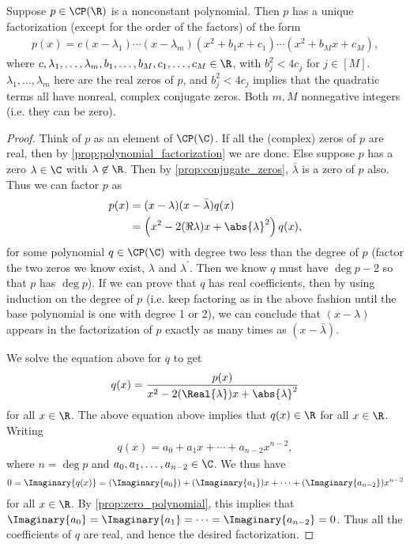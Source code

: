 \documentclass{article}
\begin{document}
\begin{prop}
  Suppose $p \in \CP(\R)$ is a nonconstant polynomial. Then $p$ has a unique factorization (except for the order of the factors) of the form
  \begin{align*}
    p(x) = c(x - \lambda_1)\cdots(x - \lambda_m)(x^2 + b_1x + c_1)\cdots(x^2 + b_Mx + c_M),
  \end{align*}
  where $c, \lambda_1, \dots, \lambda_m, b_1, \dots, b_M, c_1, \dots, c_M \in \R$, with $b_j^2 < 4c_j$ for $j \in [M]$. $\lambda_1, \dots, \lambda_m$ here are the real zeros of $p$, and
  $b_j^2 < 4c_j$ implies that the quadratic terms all have nonreal, complex conjugate zeros. Both $m, M$ nonnegative integers (i.e. they can be zero).
\end{prop}
\begin{proof}
  Think of $p$ as an element of $\CP(\C)$. If all the (complex) zeros of $p$ are real, then by \eqref{prop:polynomial_factorization} we are done. Else suppose $p$ has a zero $\lambda \in \C$
  with $\lambda \not\in \R$. Then by \eqref{prop:conjugate_zeros}, $\bar{\lambda}$ is a zero of $p$ also. Thus we can factor $p$ as
  \begin{align*}
    p(x) & = (x - \lambda)(x - \bar{\lambda})q(x) \\
    & = \left(x^2 - 2(\Re{\lambda})x + \abs{\lambda}^2\right)q(x),
  \end{align*}
  for some polynomial $q \in \CP(\C)$ with degree two less than the degree of $p$ (factor the two zeros we know exist, $\lambda$ and $\lambda^{\prime}$. Then we know $q$ must have $\deg{p} -
  2$ so that $p$ has $\deg{p}$). If we can prove that $q$ has real coefficients, then by using induction on the degree of $p$ (i.e. keep factoring as in the above fashion until the base
  polynomial is one with degree 1 or 2), we can conclude that $(x - \lambda)$ appears in the factorization of $p$ exactly as many times as $(x - \bar{\lambda})$. 

  We solve the equation above for $q$ to get 
  \begin{align*}
    q(x) = \frac{p(x)}{x^2 - 2(\Real{\lambda})x + \abs{\lambda}^2}
  \end{align*}
  for all $x \in \R$. The above equation above implies that $q(x) \in \R$ for all $x \in \R$. Writing
  \begin{align*}
    q(x) = a_0 + a_1x + \cdots + a_{n - 2}x^{n - 2},
  \end{align*}
  where $n = \deg{p}$ and $a_0, a_1, \dots, a_{n - 2} \in \C$. We thus have
  \begin{align*}
    0 = \Imaginary{q(x)} = (\Imaginary{a_0}) + (\Imaginary{a_1})x + \cdots + (\Imaginary{a_{n - 2}})x^{n - 2}
  \end{align*}
  for all $x \in \R$. By \eqref{prop:zero_polynomial}, this implies that $\Imaginary{a_0} = \Imaginary{a_1} = \cdots = \Imaginary{a_{n - 2}} = 0$. Thus all the coefficients of $q$ are real, and hence the desired
  factorization.
  

\end{proof}
\end{document}
